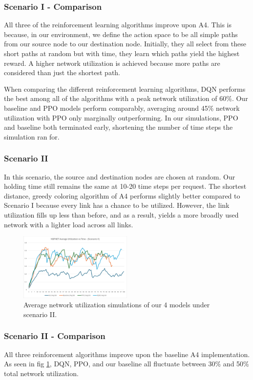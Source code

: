 \documentclass[conference]{IEEEtran}
\begin{document}
\subsubsection{Scenario I - Comparison}
All three of the reinforcement learning algorithms improve upon A4. This is because, in our environment, we define the action space to be all simple paths from our source node to our destination node. Initially, they all select from these short paths at random but with time, they learn which paths yield the highest reward. A higher network utilization is achieved because more paths are considered than just the shortest path. 

When comparing the different reinforcement learning algorithms, DQN performs the best among all of the algorithms with a peak network utilization of 60\%. Our baseline and PPO models perform comparably, averaging around 45\% network utilization with PPO only marginally outperforming. In our simulations, PPO and baseline both terminated early, shortening the number of time steps the simulation ran for. 


\subsubsection{Scenario II}
In this scenario, the source and destination nodes are chosen at random. Our holding time still remains the same at 10-20 time steps per request. The shortest distance, greedy coloring algorithm of A4 performs slightly better compared to Scenario I because every link has a chance to be utilized. However, the link utilization fills up less than before, and as a result, yields a more broadly used network with a lighter load across all links.

\begin{figure} [ht]
    \centering
    \includegraphics[width = 0.5\textwidth]{Scenario 2 Util.png}
    \caption{Average network utilization simulations of our 4 models under scenario II.}
    \label{fig:util scenario 2}
\end{figure}

\subsubsection{Scenario II - Comparison}
All three reinforcement algorithms improve upon the baseline A4 implementation. As seen in fig \ref{fig:util scenario 2}, DQN, PPO, and our baseline all fluctuate between 30\% and 50\% total network utilization. 
\end{document}
